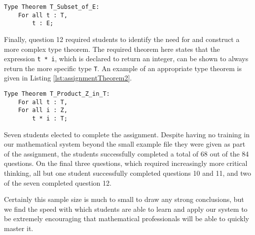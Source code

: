 \begin{lstlisting}[float=h,language=resolve,caption={A type theorem stating that \texttt{T} is a subset of \texttt{E}\label{lst:assignmentTheorem1}}]
Type Theorem T_Subset_of_E:
	For all t : T,
		t : E;
\end{lstlisting}

Finally, question 12 required students to identify the need for and construct a more complex type theorem.  The required theorem here states that the expression \texttt{t~*~i}, which is declared to return an integer, can be shown to always return the more specific type \texttt{T}.  An example of an appropriate type theorem is given in Listing \ref{lst:assignmentTheorem2}.

\begin{lstlisting}[float=h,language=resolve,caption={A type theorem stating that \texttt{t~*~i} returns a \texttt{T}\label{lst:assignmentTheorem2}}]
Type Theorem T_Product_Z_in_T:
	For all t : T,
	For all i : Z,
		t * i : T;
\end{lstlisting}

Seven students elected to complete the assignment.  Despite having no training in our mathematical system beyond the small example file they were given as part of the assignment, the students successfully completed a total of 68 out of the 84 questions.  On the final three questions, which required increasingly more critical thinking, all but one student successfully completed questions 10 and 11, and two of the seven completed question 12.

Certainly this sample size is much to small to draw any strong conclusions, but we find the speed with which students are able to learn and apply our system to be extremely encouraging that mathematical professionals will be able to quickly master it.
